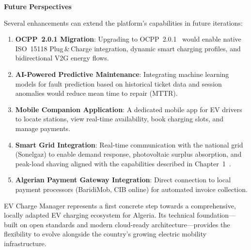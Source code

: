 \documentclass[12pt,a4paper]{report}
\begin{document}
\textbf{Future Perspectives}

Several enhancements can extend the platform's capabilities in future iterations:

\begin{enumerate}
  \item \textbf{OCPP~2.0.1 Migration}: Upgrading to OCPP~2.0.1~\autocite{ocpp201} would enable
        native ISO~15118 Plug\,\&\,Charge integration, dynamic smart charging profiles, and
        bidirectional V2G energy flows.

  \item \textbf{AI-Powered Predictive Maintenance}: Integrating machine learning models for
        fault prediction based on historical ticket data and session anomalies would reduce mean
        time to repair (MTTR).

  \item \textbf{Mobile Companion Application}: A dedicated mobile app for EV drivers to locate
        stations, view real-time availability, book charging slots, and manage payments.

  \item \textbf{Smart Grid Integration}: Real-time communication with the national grid
        (Sonelgaz) to enable demand response, photovoltaic surplus absorption, and peak-load
        shaving aligned with the capabilities described in Chapter~1~\autocite{iso15118_2022}.

  \item \textbf{Algerian Payment Gateway Integration}: Direct connection to local payment
        processors (BaridiMob, CIB online) for automated invoice collection.
\end{enumerate}

EV Charge Manager represents a first concrete step towards a comprehensive, locally adapted EV
charging ecosystem for Algeria. Its technical foundation---built on open standards and modern
cloud-ready architecture---provides the flexibility to evolve alongside the country's growing
electric mobility infrastructure.


\clearpage
\printbibliography[
  heading = bibintoc,          %
  title   = {References},
]
\end{document}
